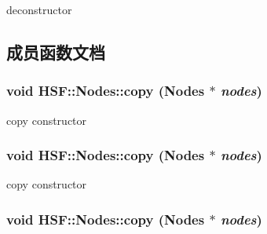 deconstructor 

\subsection{成员函数文档}
\hypertarget{classHSF_1_1Nodes_a77f909942d5128a6cf8bb7fe6348a26d}{
\subsubsection[{copy}]{\setlength{\rightskip}{0pt plus 5cm}void HSF::Nodes::copy ({\bf Nodes} $\ast$ {\em nodes})}}
\label{classHSF_1_1Nodes_a77f909942d5128a6cf8bb7fe6348a26d}


copy constructor \hypertarget{classHSF_1_1Nodes_a77f909942d5128a6cf8bb7fe6348a26d}{
\subsubsection[{copy}]{\setlength{\rightskip}{0pt plus 5cm}void HSF::Nodes::copy ({\bf Nodes} $\ast$ {\em nodes})}}
\label{classHSF_1_1Nodes_a77f909942d5128a6cf8bb7fe6348a26d}


copy constructor \hypertarget{classHSF_1_1Nodes_a77f909942d5128a6cf8bb7fe6348a26d}{
\subsubsection[{copy}]{\setlength{\rightskip}{0pt plus 5cm}void HSF::Nodes::copy ({\bf Nodes} $\ast$ {\em nodes})}}
\label{classHSF_1_1Nodes_a77f909942d5128a6cf8bb7fe6348a26d}


